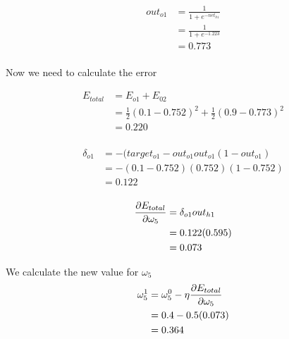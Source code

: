 \documentclass[10pt,a4paper]{article}
\begin{document}
\begin{equation}
\begin{split}
out_{o1} &= \frac{1}{1+e^{-net_{h1}}}\\ 
         &= \frac{1}{1+e^{-1.223}}\\ 
         &= 0.773\\
\end{split}
\end{equation}

Now we need to calculate the error

\begin{equation}
\begin{split}
E_{total} &= E_{o1} + E_{02} \\
          &= \frac{1}{2}(0.1-0.752)^2 + \frac{1}{2}(0.9 - 0.773)^2 \\
          &= 0.220 \\
\end{split}
\end{equation}

\begin{equation}
\begin{split}
\delta_{o1} &= -(target_{o1} -out_{o1}out_{o1}(1-out_{o1})\\
            &= -(0.1-0.752)(0.752)(1-0.752)\\
            &= 0.122\\
\end{split}
\end{equation}

\begin{equation}
\begin{split}
\pdv{E_{total}}{\omega_5} &= \delta_{o1}out_{h1}\\
                          &= 0.122(0.595)\\
                          &= 0.073\\
\end{split}
\end{equation}

We calculate the new value for $\omega_5$
\begin{equation}
\begin{split}
\omega_5^1 &= \omega_5^0 - \eta\pdv{E_{total}}{\omega_5}\\
           &= 0.4 -0.5(0.073)\\
           &= 0.364\\
\end{split}
\end{equation}
\end{document}
